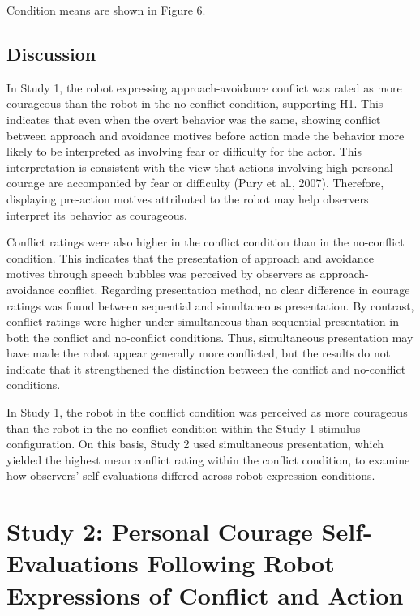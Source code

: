 \documentclass[utf8]{FrontiersinHarvard}
\begin{document}
Condition means are shown in Figure 6.

\subsection{Discussion}\label{discussion}

In Study 1, the robot expressing approach-avoidance conflict was rated as more courageous than the robot in the no-conflict condition, supporting H1. This indicates that even when the overt behavior was the same, showing conflict between approach and avoidance motives before action made the behavior more likely to be interpreted as involving fear or difficulty for the actor. This interpretation is consistent with the view that actions involving high personal courage are accompanied by fear or difficulty (Pury et al., 2007). Therefore, displaying pre-action motives attributed to the robot may help observers interpret its behavior as courageous.

Conflict ratings were also higher in the conflict condition than in the no-conflict condition. This indicates that the presentation of approach and avoidance motives through speech bubbles was perceived by observers as approach-avoidance conflict. Regarding presentation method, no clear difference in courage ratings was found between sequential and simultaneous presentation. By contrast, conflict ratings were higher under simultaneous than sequential presentation in both the conflict and no-conflict conditions. Thus, simultaneous presentation may have made the robot appear generally more conflicted, but the results do not indicate that it strengthened the distinction between the conflict and no-conflict conditions.

In Study 1, the robot in the conflict condition was perceived as more courageous than the robot in the no-conflict condition within the Study 1 stimulus configuration. On this basis, Study 2 used simultaneous presentation, which yielded the highest mean conflict rating within the conflict condition, to examine how observers' self-evaluations differed across robot-expression conditions.

\section{Study 2: Personal Courage Self-Evaluations Following Robot Expressions of Conflict and Action}\label{study-2-personal-courage-self-evaluations-following-robot-expressions-of-conflict-and-action}
\end{document}
